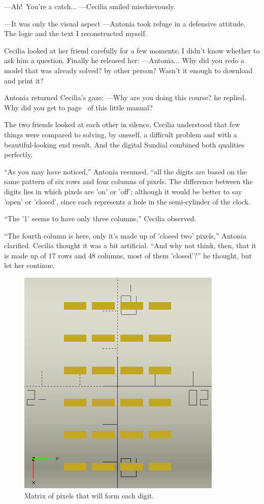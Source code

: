 ---Ah!\
You're a catch... ---Cecilia smiled mischievously.

---It was only the visual aspect ---Antonia took refuge in a defensive attitude. The logic and the text I reconstructed myself.

   Cecilia looked at her friend carefully for a few moments; I didn't know whether to ask him a question. Finally he released her: ---Antonia... Why did you redo a model that was already solved? by other person? Wasn't it enough to download and print it?

Antonia returned Cecilia's gaze: ---Why are you doing this course? he replied. Why did you get to page~\thepage{} of this little manual?

   The two friends looked at each other in silence. Cecilia understood that few things were compared to solving, by oneself, a difficult problem and with a beautiful-looking end result. And the digital Sundial combined both qualities perfectly.

``As you may have noticed,'' Antonia resumed, ``all the digits are based on the same pattern of six rows and four columns of pixels. The difference between the digits lies in which pixels are 'on' or 'off'; although it would be better to say 'open' or 'closed', since each represents a hole in the semi-cylinder of the clock.

``The '1' seems to have only three columns,'' Cecilia observed.

   ``The fourth column is here, only it's made up of 'closed two' pixels,'' Antonia clarified. Cecilia thought it was a bit artificial. ``And why not think, then, that it is made up of 17
rows and 48 columns, most of them 'closed'?'' he thought, but let her continue.

\begin{figure}[t]
  \centering
  \includegraphics[width=.35\textwidth]{imagenes/matriz.png}
  \caption{Matrix of pixels that will form each digit.}
  \label{fig:matriz}
\end{figure}

